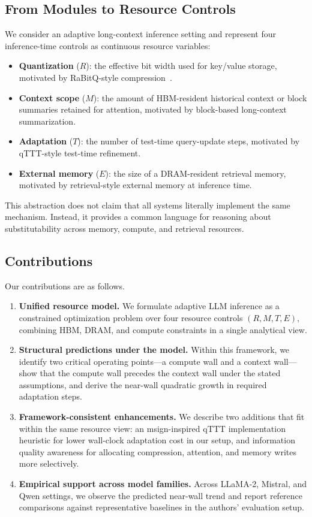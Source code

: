\documentclass[11pt,a4paper]{article}
\theoremstyle{plain}
\theoremstyle{definition}
\begin{document}
\subsection{From Modules to Resource Controls}
We consider an adaptive long-context inference setting and represent four inference-time controls as continuous resource variables:
\begin{itemize}
    \item \textbf{Quantization} ($R$): the effective bit width used for key/value storage, motivated by RaBitQ-style compression~\cite{gao2024rabitq}.
    \item \textbf{Context scope} ($M$): the amount of HBM-resident historical context or block summaries retained for attention, motivated by block-based long-context summarization.
    \item \textbf{Adaptation} ($T$): the number of test-time query-update steps, motivated by qTTT-style test-time refinement.
    \item \textbf{External memory} ($E$): the size of a DRAM-resident retrieval memory, motivated by retrieval-style external memory at inference time.
\end{itemize}

This abstraction does not claim that all systems literally implement the same mechanism. Instead, it provides a common language for reasoning about substitutability across memory, compute, and retrieval resources.

\subsection{Contributions}
Our contributions are as follows.
\begin{enumerate}
    \item \textbf{Unified resource model.} We formulate adaptive LLM inference as a constrained optimization problem over four resource controls $(R,M,T,E)$, combining HBM, DRAM, and compute constraints in a single analytical view.
    \item \textbf{Structural predictions under the model.} Within this framework, we identify two critical operating points---a compute wall and a context wall---show that the compute wall precedes the context wall under the stated assumptions, and derive the near-wall quadratic growth in required adaptation steps.
    \item \textbf{Framework-consistent enhancements.} We describe two additions that fit within the same resource view: an msign-inspired qTTT implementation heuristic for lower wall-clock adaptation cost in our setup, and information quality awareness for allocating compression, attention, and memory writes more selectively.
    \item \textbf{Empirical support across model families.} Across LLaMA-2, Mistral, and Qwen settings, we observe the predicted near-wall trend and report reference comparisons against representative baselines in the authors' evaluation setup.
\end{enumerate}
\end{document}
